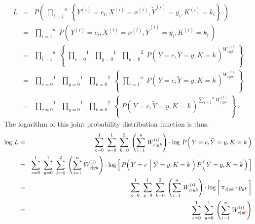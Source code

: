 \begin{enumerate}
\begin{eqnarray*}
L &=&
	P\!\left(\;
		\overset{n}{\underset{i=1}{\bigcap}}\;
		\left\{
			Y^{(i)}=c_{i},X^{(i)}=x^{(i)},\widetilde{Y}^{(i)}=y_{i},K^{(i)}=k_{i}
		\right\}
	\;\right)
\\
&=&
	\overset{n}{\underset{i=1}{\prod}} \;
	P\!\left(\,Y^{(i)}=c_{i},X^{(i)}=x^{(i)},\widetilde{Y}^{(i)}=y_{i},K^{(i)}=k_{i}\,\right)
\\
&=&
	\overset{n}{\underset{i=1}{\prod}} \;
	\left\{\;
		\overset{1}{\underset{c=0}{\prod}}\;\;
		\overset{1}{\underset{y=0}{\prod}}\;\;
		\overset{2}{\underset{k=0}{\prod}}\;
		P\!\left(\,Y=c,\widetilde{Y}=y,K=k\,\right)^{W^{(i)}_{c \vert yk}}
	\;\right\}
\\
&=&
	\overset{1}{\underset{c=0}{\prod}}\;\;
	\overset{1}{\underset{y=0}{\prod}}\;\;
	\overset{2}{\underset{k=0}{\prod}}\;
	\left\{\;
		\overset{n}{\underset{i=1}{\prod}} \;
		P\!\left(\,Y=c,\widetilde{Y}=y,K=k\,\right)^{W^{(i)}_{c \vert yk}}
	\;\right\}
\\
&=&
	\overset{1}{\underset{c=0}{\prod}}\;\;
	\overset{1}{\underset{y=0}{\prod}}\;\;
	\overset{2}{\underset{k=0}{\prod}}\;
	\left\{\;
		P\!\left(\,Y=c,\widetilde{Y}=y,K=k\,\right)
		^{\overset{n}{\underset{i=1}{\sum}}\,W^{(i)}_{c \vert yk}}
	\;\right\}\,.
\end{eqnarray*}
The logarithm of this joint probability distribution function is thus:
\begin{eqnarray*}
\log\,L &=&
	\overset{1}{\underset{c=0}{\sum}}\;\;
	\overset{1}{\underset{y=0}{\sum}}\;\;
	\overset{2}{\underset{k=0}{\sum}}\;
	\left(\overset{n}{\underset{i=1}{\sum}}\;W^{(i)}_{c \vert yk}\right)
	\cdot
	\log\,P\!\left(\,Y=c,\widetilde{Y}=y,K=k\,\right)
\\
&=&
	\overset{1}{\underset{c=0}{\sum}}\;\;
	\overset{1}{\underset{y=0}{\sum}}\;\;
	\overset{2}{\underset{k=0}{\sum}}\;
	\left(\overset{n}{\underset{i=1}{\sum}}\;W^{(i)}_{c \vert yk}\right)
	\cdot
	\log\left[\,
		P\!\left(\,Y=c\;\left\vert\;\widetilde{Y}=y,K=k\right.\,\right)
		P\!\left(\,\widetilde{Y}=y,K=k\,\right)
	\,\right]
\\
&=&
	\overset{1}{\underset{c=0}{\sum}}\;\;
	\overset{1}{\underset{y=0}{\sum}}\;\;
	\overset{2}{\underset{k=0}{\sum}}\;
	\left(\overset{n}{\underset{i=1}{\sum}}\;W^{(i)}_{c \vert yk}\right)
	\cdot
	\log\left[\,
		\pi_{c \vert yk} \overset{{\color{white}\vert}}{\cdot} p_{yk}
	\,\right]
\\
&=&
	{\color{white}+} \;\;
	\overset{1}{\underset{c=0}{\sum}}\;\;
	\overset{1}{\underset{y=0}{\sum}}\;
	\left(\overset{n}{\underset{i=1}{\sum}}\;W^{(i)}_{c \vert y{\color{red}0}}\right)

\end{eqnarray*}
\end{enumerate}
